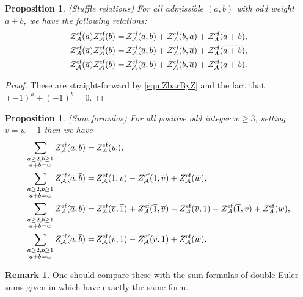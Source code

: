 \documentclass{article}
\newcommand{\calA}{\mathcal{A}}
\newcommand{\eff}{\text{\rm{ef}}}
\newcommand{\ol}{\overline}
\theoremstyle{plain}
\newtheorem{prop}[thm]{Proposition}
\theoremstyle{definition}
\newtheorem{rem}[thm]{Remark}
\begin{document}
\begin{prop} \label{prop:StuffleRel} \emph{(Stuffle relations)}
For all admissible $(a,b)$ with odd weight $a+b$, we have the following relations:
\begin{align*}
  Z_\calA^\eff(a)Z_\calA^\eff(b)=&\, Z_\calA^\eff(a,b)+ Z_\calA^\eff(b,a)+ Z_\calA^\eff(a+b),\\
  Z_\calA^\eff(\ol{a})Z_\calA^\eff(b)=&\, Z_\calA^\eff(\ol{a},b)+ Z_\calA^\eff(b,\ol{a})+ Z_\calA^\eff(\ol{a+b}),\\
  Z_\calA^\eff(\ol{a})Z_\calA^\eff(\ol{b})=&\, Z_\calA^\eff(\ol{a},\ol{b})+ Z_\calA^\eff(\ol{b},\ol{a})+ Z_\calA^\eff(a+b).
\end{align*}
\end{prop}
\begin{proof}
These are straight-forward by \eqref{equ:ZbarByZ} and the fact that $(-1)^a+(-1)^b=0$.
\end{proof}

\begin{prop}\label{prop:SumFormula}   \emph{(Sum formulas})
For all positive odd integer $w\ge 3$, setting $v=w-1$ then we have
\begin{align*}
  \sum_{\substack{a\ge 2,b\ge 1\\ a+b=w}}  Z_\calA^\eff(a,b)=&\, Z_\calA^\eff(w),\\
  \sum_{\substack{a\ge 2,b\ge 1\\ a+b=w}}  Z_\calA^\eff(\ol{a},\ol{b})=&\,  Z_\calA^\eff(\ol{1},v)- Z_\calA^\eff(\ol{1},\ol{v})+Z_\calA^\eff(\ol{w}), \\
  \sum_{\substack{a\ge 2,b\ge 1\\ a+b=w}}  Z_\calA^\eff(\ol{a},b)=&\,  Z_\calA^\eff(\ol{v},\ol{1})+ Z_\calA^\eff(\ol{1},\ol{v})-Z_\calA^\eff(\ol{v},1)-Z_\calA^\eff(\ol{1},v)+Z_\calA^\eff(w), \\
  \sum_{\substack{a\ge 2,b\ge 1\\ a+b=w}}  Z_\calA^\eff(a,\ol{b})=&\, Z_\calA^\eff(\ol{v},1)-Z_\calA^\eff(\ol{v},\ol{1})+Z_\calA^\eff(\ol{w}).
\end{align*}
\end{prop}

\begin{rem}
One should compare these with the sum formulas of double Euler sums given in \cite[Theorem 4.2]{BCJXXZhao2020c} which have exactly the same form.
\end{rem}
\end{document}
